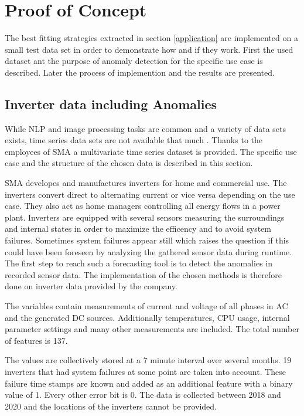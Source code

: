 \section{Proof of Concept}\label{implementation}
The best fitting strategies extracted in section \ref{application} are implemented on a small test data set in order to demonstrate how and if they work. First the used dataset ant the purpose of anomaly detection for the specific use case is described. Later the process of implemention and the results are presented.
\subsection{Inverter data including Anomalies}
While NLP and image processing tasks are common and a variety of data sets exists, time series data sets are not available that much \cite{ma_survey_2023}. Thanks to the employees of SMA a multivariate time series dataset is provided. The specific use case and the structure of the chosen data is described in this section.

SMA developes and manufactures inverters for home and commercial use. The inverters convert direct to alternating current or vice versa depending on the use case. They also act as home managers controlling all energy flows in a power plant. Inverters are equipped with several sensors measuring the surroundings and internal states in order to maximize the efficency and to avoid system failures. Sometimes system failures appear still which raises the question if this could have been foreseen by analyzing the gathered sensor data during runtime. The first step to reach such a forecasting tool is to detect the anomalies in recorded sensor data. The implementation of the chosen methods is therefore done on inverter data provided by the company.

The variables contain measurements of current and voltage of all phases in AC and the generated DC sources. Additionally temperatures, CPU usage, internal parameter settings and many other measurements are included. The total number of features is 137.

The values are collectively stored at a 7 minute interval over several months. 19 inverters that had system failures at some point are taken into account. These failure time stamps are known and added as an additional feature with a binary value of 1. Every other error bit is 0. The data is collected between 2018 and 2020 and the locations of the inverters cannot be provided.

